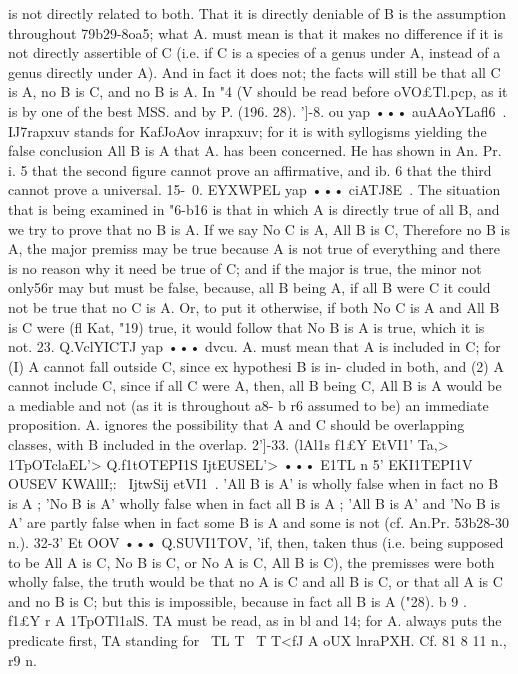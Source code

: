 {{{{{{{{{{{{{is not directly related to both. That it is directly deniable of B
is the assumption throughout 79b29-8oa5; what A. must mean is
that it makes no difference if it is not directly assertible of C (i.e.
if C is a species of a genus under A, instead of a genus directly
under A). And in fact it does not; the facts will still be that all
C is A, no B is C, and no B is A.
In "4 (V should be read before oVO£Tl.pcp, as it is by one of the
best MSS. and by P. (196. 28).
']-8. ou yap ••• auAAoYLafl6~. IJ7rapxuv stands for KafJoAov
inrapxuv; for it is with syllogisms yielding the false conclusion
All B is A that A. has been concerned. He has shown in An. Pr.
i. 5 that the second figure cannot prove an affirmative, and
ib. 6 that the third cannot prove a universal.
15-~0. EYXWPEL yap ••• ciATJ8E~. The situation that is being
examined in "6-b16 is that in which A is directly true of all B,
and we try to prove that no B is A. If we say No C is A, All
B is C, Therefore no B is A, the major premiss may be true
because A is not true of everything and there is no reason why
it need be true of C; and if the major is true, the minor not only56r
may but must be false, because, all B being A, if all B were C
it could not be true that no C is A. Or, to put it otherwise, if
both No C is A and All B is C were (fl Kat, "19) true, it would
follow that No B is A is true, which it is not.
23. Q.VclYICTJ yap ••• dvcu. A. must mean that A is included
in C; for (I) A cannot fall outside C, since ex hypothesi B is in-
cluded in both, and (2) A cannot include C, since if all C were A,
then, all B being C, All B is A would be a mediable and not (as
it is throughout a8- b r6 assumed to be) an immediate proposition.
A. ignores the possibility that A and C should be overlapping
classes, with B included in the overlap.
2']-33. (lAl1s f1£Y EtVI1' Ta,> 1TpOTclaEL'> Q.f1tOTEPI1S IjtEUSEL'> •••
E1TL n 5' EKI1TEPI1V OUSEV KWAllI;:~ IjtwSij etVI1~. 'All B is A' is wholly
false when in fact no B is A ; 'No B is A' wholly false when in
fact all B is A ; 'All B is A' and 'No B is A' are partly false when
in fact some B is A and some is not (cf. An.Pr. 53b28-30 n.).
32-3' Et OOV ••• Q.SUVI1TOV, 'if, then, taken thus (i.e. being
supposed to be All A is C, No B is C, or No A is C, All B is C), the
premisses were both wholly false, the truth would be that no A
is C and all B is C, or that all A is C and no B is C; but this is
impossible, because in fact all B is A ("28).
b 9 . ~ f1£Y r A 1TpOTl1alS. TA must be read, as in bl and 14;
for A. always puts the predicate first, TA standing for ~TL T~ T
T<fJ A oUX lnraPXH. Cf. 81 8 11 n., r9 n.
}}}}}}}}}}}}}
